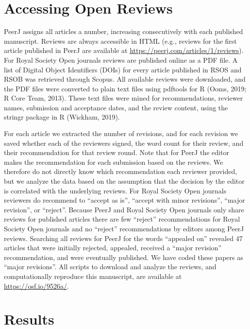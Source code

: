 \documentclass[
  english,
  ,jou, a4paper,floatsintext]{apa6}
\begin{document}
\hypertarget{accessing-open-reviews}{%
\section{Accessing Open Reviews}\label{accessing-open-reviews}}

PeerJ assigns all articles a number, increasing consecutively with each published manuscript. Reviews are always accessible in HTML (e.g., reviews for the first article published in PeerJ are available at \url{https://peerj.com/articles/1/reviews}). For Royal Society Open journals reviews are published online as a PDF file. A list of Digital Object Identifiers (DOIs) for every article published in RSOS and RSOB was retrieved through Scopus. All available reviews were downloaded, and the PDF files were converted to plain text files using pdftools for R (Ooms, 2019; R Core Team, 2013). These text files were mined for recommendations, reviewer names, submission and acceptance dates, and the review content, using the stringr package in R (Wickham, 2019).

For each article we extracted the number of revisions, and for each revision we saved whether each of the reviewers signed, the word count for their review, and their recommendation for that review round. Note that for PeerJ the editor makes the recommendation for each submission based on the reviews. We therefore do not directly know which recommendation each reviewer provided, but we analyze the data based on the assumption that the decision by the editor is correlated with the underlying reviews. For Royal Society Open journals reviewers do recommend to \enquote{accept as is}, \enquote{accept with minor revisions}, \enquote{major revision}, or \enquote{reject}. Because PeerJ and Royal Society Open journals only share reviews for published articles there are few \enquote{reject} recommendations for Royal Society Open journals and no \enquote{reject} recommendations by editors among PeerJ reviews. Searching all reviews for PeerJ for the words \enquote{appealed on} revealed 47 articles that were initially rejected, appealed, received a \enquote{major revision} recommendation, and were eventually published. We have coded these papers as \enquote{major revisions}. All scripts to download and analyze the reviews, and computationally reproduce this manuscript, are available at \url{https://osf.io/9526a/}.

\hypertarget{results}{%
\section{Results}\label{results}}
\end{document}

